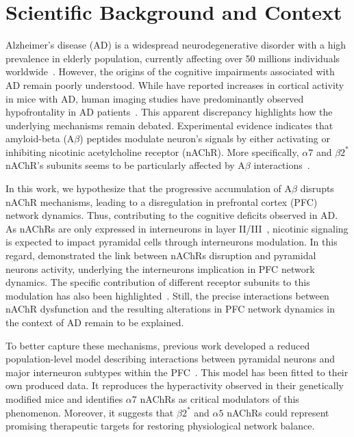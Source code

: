 \documentclass[10pt,letterpaper]{article}
\begin{document}
\section{Scientific Background and Context}
{
Alzheimer's disease (AD) is a widespread neurodegenerative disorder with a high prevalence in elderly population, currently affecting over 50 millions individuals worldwide~\citep{Breijyeh2020}. However, the origins of the cognitive impairments associated with AD remain poorly understood. While \citet{Palop2007} have reported increases in cortical activity in mice with AD, human imaging studies have predominantly observed hypofrontality in AD patients~\citep{Choi2023}. This apparent discrepancy highlights how the underlying mechanisms remain debated. Experimental evidence indicates that amyloid-beta (A$\beta$) peptides modulate neuron's signals by either activating or inhibiting nicotinic acetylcholine receptor (nAChR). More specifically, $\alpha7$ and $\beta2^*$ nAChR's subunits seems to be particularly affected by A$\beta$ interactions~\citep{Lombardo2015,Parri2011}.

In this work, we hypothesize that the progressive accumulation of A$\beta$ disrupts nAChR mechanisms, leading to a disregulation in prefrontal cortex (PFC) network dynamics. Thus, contributing to the cognitive deficits observed in AD. As nAChRs are only expressed in interneurons in layer II/III~\citep{Poorthuis2013}, nicotinic signaling is expected to impact pyramidal cells through interneurons modulation. In this regard, \citet{Koukouli2017} demonstrated the link between nAChRs disruption and pyramidal neurons activity, underlying the interneurons implication in PFC network dynamics. The specific contribution of different receptor subunits to this modulation has also been highlighted~\citep{Maskos2014}. Still, the precise interactions between nAChR dysfunction and the resulting alterations in PFC network dynamics in the context of AD remain to be explained.

To better capture these mechanisms, previous work developed a reduced population-level model describing interactions between pyramidal neurons and major interneuron subtypes within the PFC~\citep{Koukouli2025}. This model has been fitted to their own produced data. It reproduces the hyperactivity observed in their genetically modified mice and identifies $\alpha7$ nAChRs as critical modulators of this phenomenon. Moreover, it suggests that $\beta2^*$ and $\alpha5$ nAChRs could represent promising therapeutic targets for restoring physiological network balance.

}
\end{document}
